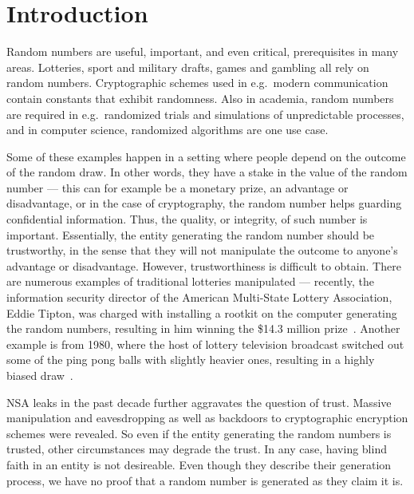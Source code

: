 \section{Introduction}\label{cha:introduction}

Random numbers are useful, important, and even critical, prerequisites in many areas. Lotteries, sport and military drafts, games and gambling all rely on random numbers. Cryptographic schemes used in e.g.\ modern communication contain constants that exhibit randomness. Also in academia, random numbers are required in e.g.\ randomized trials and simulations of unpredictable processes, and in computer science, randomized algorithms are one use case.

Some of these examples happen in a setting where people depend on the outcome of the random draw. In other words, they have a stake in the value of the random number --- this can for example be a monetary prize, an advantage or disadvantage, or in the case of cryptography, the random number helps guarding confidential information. Thus, the quality, or integrity, of such number is important. Essentially, the entity generating the random number should be trustworthy, in the sense that they will not manipulate the outcome to anyone's advantage or disadvantage. However, trustworthiness is difficult to obtain. There are numerous examples of traditional lotteries manipulated --- recently, the information security director of the American Multi-State Lottery Association, Eddie Tipton, was charged with installing a rootkit on the computer generating the random numbers, resulting in him winning the \$14.3 million prize~\cite{bbclotteryexploit}. Another example is from 1980, where the host of lottery television broadcast switched out some of the ping pong balls with slightly heavier ones, resulting in a highly biased draw~\cite{nickperry-lotteryexploit}.

NSA leaks in the past decade further aggravates the question of trust. Massive manipulation and eavesdropping as well as backdoors to cryptographic encryption schemes were revealed. So even if the entity generating the random numbers is trusted, other circumstances may degrade the trust. In any case, having blind faith in an entity is not desireable. Even though they describe their generation process, we have no proof that a random number is generated as they claim it is.


